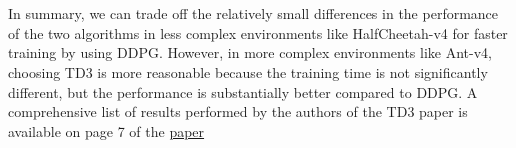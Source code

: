 \documentclass[english, a4paper,12pt]{article}
\begin{document}
\\
\vspace*{-2mm}
\\
\hspace*{5mm} In summary, we can trade off the relatively small differences in the performance of the two algorithms in less complex environments like HalfCheetah-v4 for faster training by using DDPG. However, in more complex environments like Ant-v4, choosing TD3 is more reasonable because the training time is not significantly different, but the performance is substantially better compared to DDPG. A comprehensive list of results performed by the authors of the TD3 paper is available on page 7 of the \href{https://arxiv.org/pdf/1802.09477}{paper}
\end{document}
